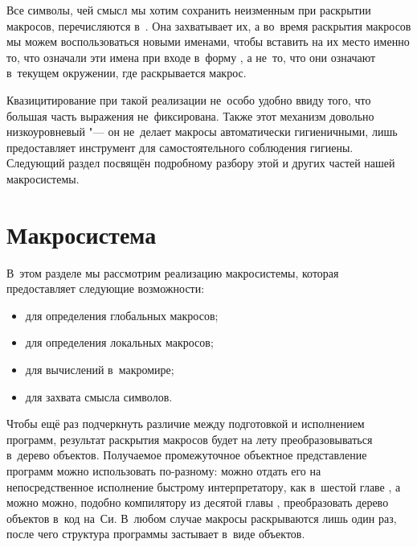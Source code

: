 Все символы, чей смысл мы хотим сохранить неизменным при раскрытии макросов,
перечисляются в~. Она захватывает их, а во~время раскрытия
макросов мы можем воспользоваться новыми именами, чтобы вставить на их место
именно то, что означали эти имена при входе в~форму , а не~то,
что они означают в~текущем окружении, где раскрывается макрос.

Квазицитирование при такой реализации не~особо удобно ввиду того, что большая
часть выражения не~фиксирована. Также этот механизм довольно низкоуровневый "---
он не~делает макросы автоматически гигиеничными, лишь предоставляет инструмент
для самостоятельного соблюдения гигиены. Следующий раздел посвящён подробному
разбору этой и других частей нашей макросистемы.


\section{Макросистема}\label{macros/sect:macrosystem}

В~этом разделе мы рассмотрим реализацию макросистемы, которая предоставляет
следующие возможности:

\begin{itemize}
  \item {} для определения глобальных макросов;

  \item {} для определения локальных макросов;

  \item {} для вычислений в~макромире;

  \item {} для захвата смысла символов.
\end{itemize}

Чтобы ещё раз подчеркнуть различие между подготовкой и исполнением программ,
результат раскрытия макросов будет на лету преобразовываться в~дерево объектов.
Получаемое промежуточное объектное представление программ можно использовать
по-разному: можно отдать его на непосредственное исполнение быстрому
интерпретатору, как в~шестой главе , а можно можно,
подобно компилятору из десятой главы \seePage[chapter:cc], преобразовать дерево
объектов в~код на~Си. В~любом случае макросы раскрываются лишь один раз, после
чего структура программы застывает в~виде объектов.



